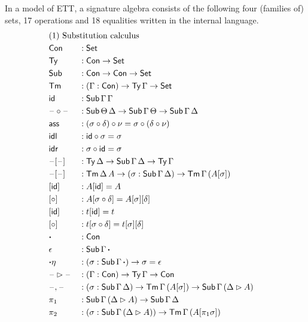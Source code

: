 \documentclass[a4paper,UKenglish,cleveref, autoref]{lipics-v2019}
\begin{document}
\begin{definition}\label{def:algebra}
  In a model of ETT, a signature algebra consists of the following
  four (families of) sets, 17 operations and 18 equalities written in
  the internal language.
\begin{alignat*}{5}
  & \rlap{(1) Substitution calculus} \\
  & \Con && : \Set \\
  & \Ty  && : \Con\ra\Set \\
  & \Sub  && : \Con\ra\Con\ra\Set \\
  & \Tm  && : (\Gamma:\Con)\ra\Ty\,\Gamma\ra\Set \\
  & \id && : \Sub\,\Gamma\,\Gamma \\
  & \blank\circ\blank && : \Sub\,\Theta\,\Delta\ra\Sub\,\Gamma\,\Theta\ra\Sub\,\Gamma\,\Delta \\
  & \ass && : (\sigma \circ \delta) \circ \nu = \sigma \circ (\delta \circ \nu) \\
  & \idl && : \id\circ\sigma = \sigma \\
  & \idr && : \sigma\circ\id = \sigma \\
  & \blank[\blank] && : \Ty\,\Delta\ra\Sub\,\Gamma\,\Delta\ra\Ty\,\Gamma \\
  & \blank[\blank] && : \Tm\,\Delta\,A\ra(\sigma:\Sub\,\Gamma\,\Delta)\ra\Tm\,\Gamma\,(A[\sigma]) \\
  & [\id] && : A[\id] = A \\
  & [\circ] && : A[\sigma \circ \delta] = A[\sigma][\delta] \\
  & [\id] && : t[\id] = t \\
  & [\circ] && : t[\sigma \circ \delta] = t[\sigma][\delta] \\
  & \boldsymbol{\cdot} && : \Con \\
  & \epsilon && : \Sub\,\Gamma\,\boldsymbol{\cdot} \\
  & {\boldsymbol{\cdot}\eta} && : (\sigma : \Sub\,\Gamma\,\boldsymbol{\cdot}) \ra \sigma = \epsilon \\
  & \blank\ext\blank && : (\Gamma:\Con)\ra\Ty\,\Gamma\ra\Con \\
  & \blank,\blank && : (\sigma:\Sub\,\Gamma\,\Delta)\ra\Tm\,\Gamma\,(A[\sigma])\ra\Sub\,\Gamma\,(\Delta\ext A) \\
  & \pi_1 && : \Sub\,\Gamma\,(\Delta\ext A)\ra \Sub\,\Gamma\,\Delta \\
  & \pi_2 && : (\sigma : \Sub\,\Gamma\,(\Delta\ext A))\ra \Tm\,\Gamma\,(A[\pi_1 \sigma]) \\

\end{alignat*}
\end{definition}
\end{document}

